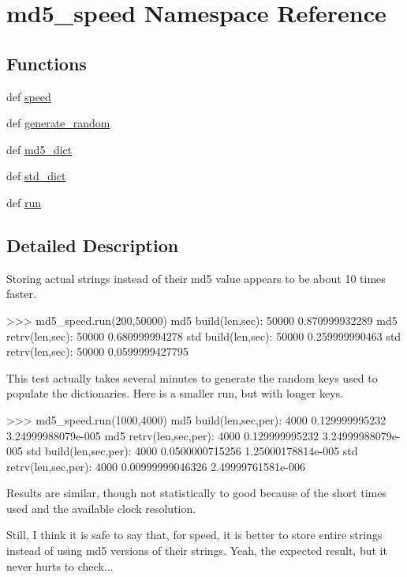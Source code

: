 \hypertarget{namespacemd5__speed}{}\section{md5\+\_\+speed Namespace Reference}
\label{namespacemd5__speed}
\subsection*{Functions}
\begin{DoxyCompactItemize}
\item 
def \hyperlink{namespacemd5__speed_a9b48f41d5831f4f26ab2646ab4da3a42}{speed}
\item 
def \hyperlink{namespacemd5__speed_aa871dac0130167f1fc93167c31dbd5b5}{generate\+\_\+random}
\item 
def \hyperlink{namespacemd5__speed_a712a51f1188996bb84dee41b569194d0}{md5\+\_\+dict}
\item 
def \hyperlink{namespacemd5__speed_ab0a449145643468e54811d4cb4fc0011}{std\+\_\+dict}
\item 
def \hyperlink{namespacemd5__speed_a0fdc6f492b2989e2c98c8644a7560fcf}{run}
\end{DoxyCompactItemize}


\subsection{Detailed Description}
\begin{DoxyVerb}Storing actual strings instead of their md5 value appears to
be about 10 times faster.

>>> md5_speed.run(200,50000)
md5 build(len,sec): 50000 0.870999932289
md5 retrv(len,sec): 50000 0.680999994278
std build(len,sec): 50000 0.259999990463
std retrv(len,sec): 50000 0.0599999427795

This test actually takes several minutes to generate the random
keys used to populate the dictionaries.  Here is a smaller run,
but with longer keys.

>>> md5_speed.run(1000,4000)
md5 build(len,sec,per): 4000 0.129999995232 3.24999988079e-005
md5 retrv(len,sec,per): 4000 0.129999995232 3.24999988079e-005
std build(len,sec,per): 4000 0.0500000715256 1.25000178814e-005
std retrv(len,sec,per): 4000 0.00999999046326 2.49999761581e-006

Results are similar, though not statistically to good because of
the short times used and the available clock resolution.

Still, I think it is safe to say that, for speed, it is better
to store entire strings instead of using md5 versions of
their strings.  Yeah, the expected result, but it never hurts
to check...\end{DoxyVerb}
 

